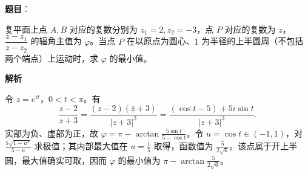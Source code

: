 \begin{answer}

\textbf{题目}：

复平面上点 $A,B$ 对应的复数分别为 $z_1=2,z_2=-3$，点 $P$ 对应的复数为 $z$，$\dfrac{z-z_1}{z-z_2}$ 的辐角主值为 $\varphi$。当点 $P$ 在以原点为圆心、$1$ 为半径的上半圆周（不包括两个端点）上运动时，求 $\varphi$ 的最小值。

\textbf{解析}

令 $z=e^{it}$，$0<t<\pi$。有
\nopagebreak[4]
\[
\frac{z-2}{z+3}=\frac{(z-2)(\bar z+3)}{|z+3|^2}
=\frac{(\cos t-5)+5i\sin t}{|z+3|^2}.
\]
实部为负、虚部为正，故 $\varphi=\pi-\arctan\frac{5\sin t}{5-\cos t}$。令 $u=\cos t\in(-1,1)$，对 $\frac{5\sqrt{1-u^2}}{5-u}$ 求极值；其内部最大值在 $u=\frac15$ 取得，函数值为 $\frac5{2\sqrt6}$。该点属于开上半圆，最大值确实可取，因而 $\varphi$ 的最小值为 $\pi-\arctan\frac5{2\sqrt6}$。


\end{answer}